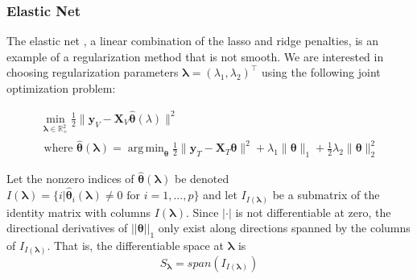 \documentclass[10pt,letterpaper]{article}
\DeclareMathOperator*{\argmin}{arg\,min}
\begin{document}
%



\subsubsection{Elastic Net}\label{sec:enet}

The elastic net \citep{zou2003regression}, a linear combination of the lasso and ridge penalties, is an example of a regularization method that is not smooth. We are interested in choosing regularization parameters $\boldsymbol{\lambda} = (\lambda_1, \lambda_2)^\top$ using the following joint optimization problem:

\begin{equation}
\begin{array}{c}
\min_{\boldsymbol{\lambda} \in \mathbb{R}^2_{+}} \frac{1}{2} \| \boldsymbol{y}_V - \boldsymbol{X}_V \hat{\boldsymbol{\theta}} (\lambda) \| ^2 \\
\text{ where }
\hat{\boldsymbol{\theta}} (\boldsymbol{\lambda}) = \argmin_{\boldsymbol{\theta}} \frac{1}{2} \| \boldsymbol{y}_T - \boldsymbol{X}_T \boldsymbol{\theta} \| ^2
+ \lambda_1 \| \boldsymbol{\theta} \|_1
+ \frac{1}{2}\lambda_2 \| \boldsymbol{\theta} \|_2^2
\end{array}
\end{equation}

Let the nonzero indices of $\hat{\boldsymbol{\theta}}(\boldsymbol{\lambda})$ be denoted $I(\boldsymbol\lambda) = \{i | \hat{\boldsymbol{\theta}}_i(\boldsymbol\lambda) \ne 0 \text{ for } i=1,...,p \}$ and let $I_{I(\boldsymbol \lambda)}$ be a submatrix of the identity matrix with columns $I(\boldsymbol\lambda)$. Since $|\cdot|$ is not differentiable at zero, the directional derivatives of $||\boldsymbol \theta||_1$ only exist along directions spanned by the columns of $I_{I(\boldsymbol \lambda)}$. That is, the differentiable space at $\boldsymbol \lambda$ is
\begin{equation}
S_{\boldsymbol{\lambda}} = span(I_{I(\boldsymbol \lambda)})
\end{equation}
\end{document}
